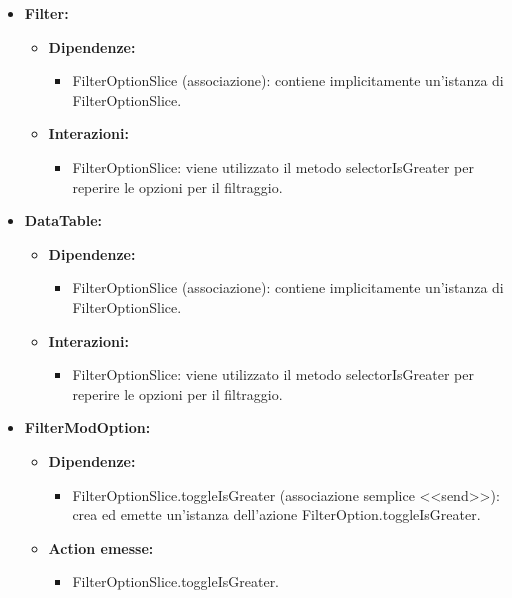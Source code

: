 \begin{itemize}
    \item \textbf{Filter:}
          \begin{itemize}
              \item \textbf{Dipendenze:}
                    \begin{itemize}
                        \item FilterOptionSlice (associazione): contiene implicitamente un'istanza di
                              FilterOptionSlice.
                    \end{itemize}
              \item \textbf{Interazioni:}
                    \begin{itemize}
                        \item FilterOptionSlice: viene utilizzato il metodo selectorIsGreater per reperire le
                              opzioni per il filtraggio.
                    \end{itemize}
          \end{itemize}

    \item \textbf{DataTable:}
          \begin{itemize}
              \item \textbf{Dipendenze:}
                    \begin{itemize}
                        \item FilterOptionSlice (associazione): contiene implicitamente un'istanza di
                              FilterOptionSlice.
                    \end{itemize}
              \item \textbf{Interazioni:}
                    \begin{itemize}
                        \item FilterOptionSlice: viene utilizzato il metodo selectorIsGreater per reperire le
                              opzioni per il filtraggio.
                    \end{itemize}
          \end{itemize}

    \item \textbf{FilterModOption:}
          \begin{itemize}
              \item \textbf{Dipendenze:}
                    \begin{itemize}
                        \item FilterOptionSlice.toggleIsGreater (associazione semplice <<send>>): crea ed
                              emette un'istanza dell'azione FilterOption.toggleIsGreater.
                    \end{itemize}
              \item \textbf{Action emesse:}
                    \begin{itemize}
                        \item FilterOptionSlice.toggleIsGreater.
                    \end{itemize}
          \end{itemize}
\end{itemize}

